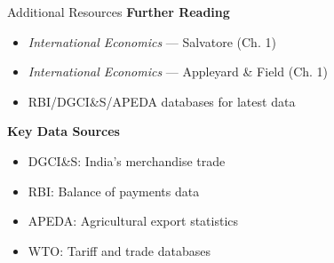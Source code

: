 \documentclass[
  ignorenonframetext,
  aspectratio=169,
]{beamer}
\makeatletter
\providecommand{\tightlist}{%
  \setlength{\itemsep}{0pt}\setlength{\parskip}{0pt}}
\let\quarto@originallabel\label
\DeclareRobustCommand*{\label}[1]{\quarto@originallabel{#1}}
\makeatother
\begin{document}
\begin{frame}{Additional Resources}
\label{additional-resources}
\textbf{Further Reading}

\begin{itemize}
\tightlist
\item
  \emph{International Economics} --- Salvatore (Ch. 1)
\item
  \emph{International Economics} --- Appleyard \& Field (Ch. 1)
\item
  RBI/DGCI\&S/APEDA databases for latest data
\end{itemize}

\textbf{Key Data Sources}

\begin{itemize}
\tightlist
\item
  DGCI\&S: India's merchandise trade
\item
  RBI: Balance of payments data\\
\item
  APEDA: Agricultural export statistics
\item
  WTO: Tariff and trade databases
\end{itemize}
\end{frame}
\end{document}

